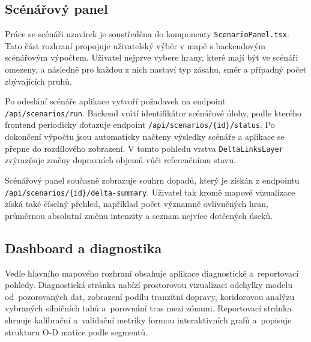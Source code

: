 
\subsection{Scénářový panel}
\label{sec:impl-frontend-scenario}

Práce se scénáři uzavírek je soustředěna do komponenty \texttt{ScenarioPanel.tsx}. Tato část rozhraní propojuje uživatelský výběr v mapě s backendovým scénářovým výpočtem. Uživatel nejprve vybere hrany, které mají být ve scénáři omezeny, a následně pro každou z nich nastaví typ zásahu, směr a případný počet zbývajících pruhů.

Po odeslání scénáře aplikace vytvoří požadavek na endpoint \texttt{/api/scenarios/run}. Backend vrátí identifikátor scénářové úlohy, podle kterého frontend periodicky dotazuje endpoint \texttt{/api/scenarios/\{id\}/status}. Po dokončení výpočtu jsou automaticky načteny výsledky scénáře a aplikace se přepne do rozdílového zobrazení. V tomto pohledu vrstva \texttt{DeltaLinksLayer} zvýrazňuje změny dopravních objemů vůči referenčnímu stavu.

Scénářový panel současně zobrazuje souhrn dopadů, který je získán z endpointu \texttt{/api/scenarios/\{id\}/delta-summary}. Uživatel tak kromě mapové vizualizace získá také číselný přehled, například počet významně ovlivněných hran, průměrnou absolutní změnu intenzity a seznam nejvíce dotčených úseků.

\subsection{Dashboard a diagnostika}
\label{sec:impl-frontend-dashboard}

Vedle hlavního mapového rozhraní obsahuje aplikace diagnostické a~reportovací pohledy. Diagnostická stránka nabízí prostorovou vizualizaci odchylky modelu od~pozorovaných dat, zobrazení podílu tranzitní dopravy, koridorovou analýzu vybraných silničních tahů a~porovnání tras mezi zónami. Reportovací stránka shrnuje kalibrační a~validační metriky formou interaktivních grafů a~popisuje strukturu O-D matice podle segmentů.


